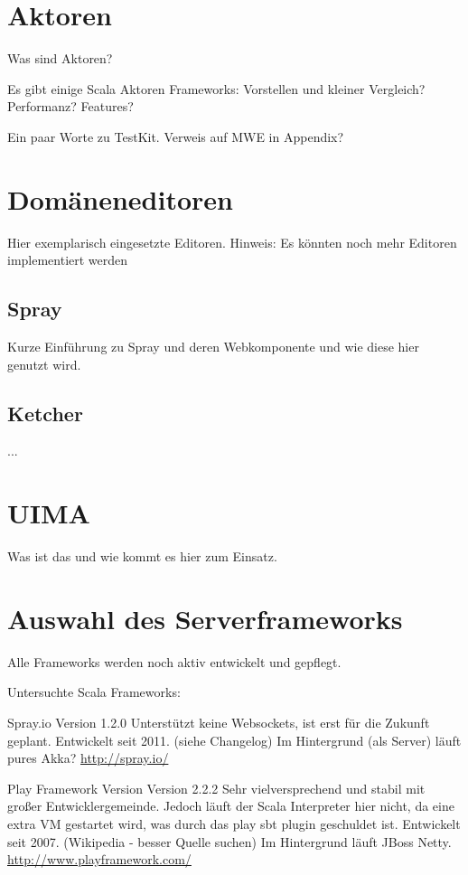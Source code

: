 

\section{Aktoren}

Was sind Aktoren?

Es gibt einige Scala Aktoren Frameworks: Vorstellen und kleiner Vergleich?
Performanz? Features?

Ein paar Worte zu TestKit. Verweis auf MWE in Appendix?


\section{Domäneneditoren}

Hier exemplarisch eingesetzte Editoren. Hinweis: Es könnten noch mehr
Editoren implementiert werden

\subsection{Spray}

Kurze Einführung zu Spray und deren Webkomponente und wie diese hier genutzt
wird.

\subsection{Ketcher}

...


\section{UIMA}

Was ist das und wie kommt es hier zum Einsatz.


\section{Auswahl des Serverframeworks}                         \label{sec.server}

Alle Frameworks werden noch aktiv entwickelt und gepflegt.

Untersuchte Scala Frameworks:

Spray.io Version 1.2.0
Unterstützt keine Websockets, ist erst für die Zukunft geplant.
Entwickelt seit 2011. (siehe Changelog)
Im Hintergrund (als Server) läuft pures Akka?
\url{http://spray.io/}

Play Framework Version Version 2.2.2
Sehr vielversprechend und stabil mit großer Entwicklergemeinde.
Jedoch läuft der Scala Interpreter hier nicht, da eine extra VM gestartet
wird, was durch das play sbt plugin geschuldet ist.
Entwickelt seit 2007. (Wikipedia - besser Quelle suchen)
Im Hintergrund läuft JBoss Netty.
\url{http://www.playframework.com/}

